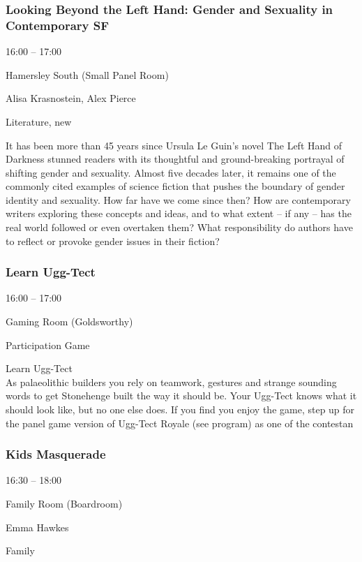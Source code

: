 \documentclass{scrreprt}
\begin{document}
\begin{multicols}{2}
\subsubsection*{Looking Beyond the Left Hand: Gender and Sexuality in Contemporary SF}\begin{description}
\setlength{\itemsep}{0pt}
\setlength{\parsep}{0pt}
\setlength{\parskip}{0pt}
\item[Time:]{16:00 -- 17:00}
\item[Venue:]{Hamersley South (Small Panel Room)}
\item[People:]{Alisa Krasnostein, Alex Pierce}
\item[Tags:]{Literature, new}\end{description}
It has been more than 45 years since Ursula Le Guin’s novel The Left Hand of Darkness stunned readers with its thoughtful and ground-breaking portrayal of shifting gender and sexuality. Almost five decades later, it remains one of the commonly cited examples of science fiction that pushes the boundary of gender identity and sexuality. How far have we come since then? How are contemporary writers exploring these concepts and ideas, and to what extent – if any – has the real world followed or even overtaken them? What responsibility do authors have to reflect or provoke gender issues in their fiction?
\subsubsection*{Learn Ugg-Tect}\begin{description}
\setlength{\itemsep}{0pt}
\setlength{\parsep}{0pt}
\setlength{\parskip}{0pt}
\item[Time:]{16:00 -- 17:00}
\item[Venue:]{Gaming Room (Goldsworthy)}
\item[Tags:]{Participation Game}\end{description}
Learn Ugg-Tect\\As palaeolithic builders you rely on teamwork, gestures and strange sounding words to get Stonehenge built the way it should be. Your Ugg-Tect knows what it should look like, but no one else does.  If you find you enjoy the game, step up for the panel game version of Ugg-Tect Royale (see program) as one of the contestan
\subsubsection*{Kids Masquerade}\begin{description}
\setlength{\itemsep}{0pt}
\setlength{\parsep}{0pt}
\setlength{\parskip}{0pt}
\item[Time:]{16:30 -- 18:00}
\item[Venue:]{Family Room (Boardroom)}
\item[People:]{Emma Hawkes}
\item[Tags:]{Family}\end{description}


\end{multicols}
\end{document}
